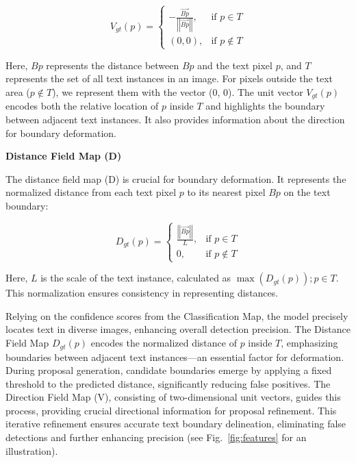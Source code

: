 \documentclass[default,iicol]{sn-jnl}%
\begin{document}
\begin{equation}
	V_{gt}(p) =
	\begin{cases}
		-\frac{\overrightarrow{Bp}}{\left|\left|\overrightarrow{Bp}\right|\right|}, & \text{if } p \in T \\
		(0, 0), & \text{if } p \notin T
	\end{cases}
\end{equation}

Here, \( Bp \) represents the distance between \( Bp \) and the text pixel \( p \), and \( T \) represents the set of all text instances in an image. For pixels outside the text area (\( p \notin T \)), we represent them with the vector (0, 0). The unit vector \( V_{gt}(p) \) encodes both the relative location of \( p \) inside \( T \) and highlights the boundary between adjacent text instances. It also provides information about the direction for boundary deformation.

\textbf{Distance Field Map (D)}

The distance field map (D) is crucial for boundary deformation. It represents the normalized distance from each text pixel \( p \) to its nearest pixel \( Bp \) on the text boundary:

\begin{equation}
	D_{gt}(p) =
	\begin{cases}
		\frac{\left|\left|\overrightarrow{Bp}\right|\right|}{L}, & \text{if } p \in T \\
		0, & \text{if } p \notin T
	\end{cases}
\end{equation}

Here, \( L \) is the scale of the text instance, calculated as \( \max(D_{gt}(p)); {p \in T} \). This normalization ensures consistency in representing distances.

Relying on the confidence scores from the Classification Map, the model precisely locates text in diverse images, enhancing overall detection precision. The Distance Field Map \( D_{gt}(p) \) encodes the normalized distance of \( p \) inside \( T \), emphasizing boundaries between adjacent text instances—an essential factor for deformation. During proposal generation, candidate boundaries emerge by applying a fixed threshold to the predicted distance, significantly reducing false positives. The Direction Field Map (V), consisting of two-dimensional unit vectors, guides this process, providing crucial directional information for proposal refinement. This iterative refinement ensures accurate text boundary delineation, eliminating false detections and further enhancing precision (see Fig.~\ref{fig:features} for an illustration).
\end{document}
